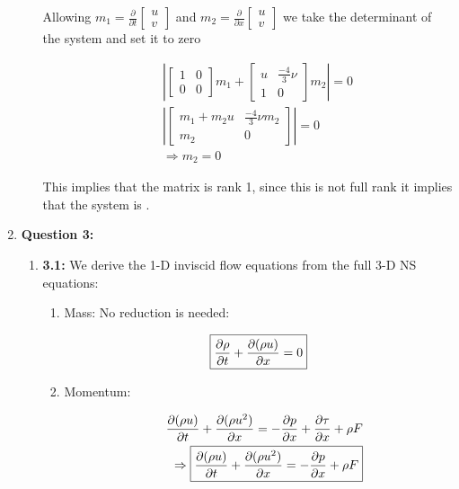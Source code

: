 \documentclass{article}
\begin{document}
\begin{enumerate}
\begin{enumerate}
Allowing $m_1 = \frac{\partial}{\partial t}\left[\begin{array}{c}u \\ v \end{array} \right]$ and $m_2 = \frac{\partial}{\partial x}\left[\begin{array}{c}u \\ v \end{array} \right]$ we take the determinant of the system and set it to zero

\begin{eqnarray}
&& \left|\left[\begin{array}{cc} 1 & 0 \\ 0 & 0\end{array} \right] m_1 + \left[\begin{array}{cc}u & \frac{-4}{3}\nu \\ 1 & 0  \end{array} \right] m_2 \right|=0 \nonumber \\
&& \left|\left[\begin{array}{cc} m_1 + m_2 u & \frac{-4}{3}\nu m_2  \\ m_2 & 0\end{array} \right]\right| = 0\nonumber \\
&& \Rightarrow m_2 = 0 
\end{eqnarray}

This implies that the matrix is rank 1, since this is not full rank it implies that the system is .

\end{enumerate}


\item \textbf{Question 3:}
\begin{enumerate}
\item \textbf{3.1:}
We derive the 1-D inviscid flow equations from the full 3-D NS equations:

\begin{enumerate}
\item Mass: No reduction is needed:

\begin{equation}
\boxed{\frac{\partial \rho}{\partial t} + \frac{\partial (\rho u)}{\partial x} = 0}
\end{equation}

\item Momentum:

\begin{eqnarray}
&&\frac{\partial (\rho u)}{\partial t} + \frac{\partial (\rho u^2)}{\partial x} = -\frac{\partial p}{\partial x} + \frac{\partial \tau}{\partial x} + \rho F\nonumber \\
&& \Rightarrow \boxed{\frac{\partial (\rho u)}{\partial t} + \frac{\partial (\rho u^2)}{\partial x} = -\frac{\partial p}{\partial x} + \rho F}
\end{eqnarray}


\end{enumerate}
\end{enumerate}
\end{enumerate}
\end{document}
